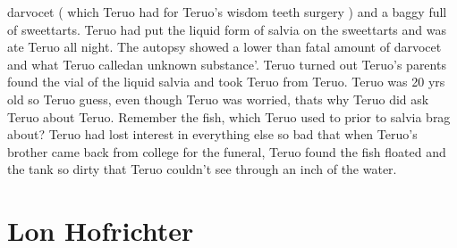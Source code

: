 \documentclass[12pt]{book}
\begin{document}
darvocet ( which Teruo had for Teruo's wisdom teeth surgery ) and a baggy full of sweettarts. Teruo had put the liquid form of salvia on the sweettarts and was ate Teruo all night. The autopsy showed a lower than fatal amount of darvocet and what Teruo calledan unknown substance'. Teruo turned out Teruo's parents found the vial of the liquid salvia and took Teruo from Teruo. Teruo was 20 yrs old so Teruo guess, even though Teruo was worried, thats why Teruo did ask Teruo about Teruo. Remember the fish, which Teruo used to prior to salvia brag about? Teruo had lost interest in everything else so bad that when Teruo's brother came back from college for the funeral, Teruo found the fish floated and the tank so dirty that Teruo couldn't see through an inch of the water.



\chapter{Lon Hofrichter}
\end{document}
